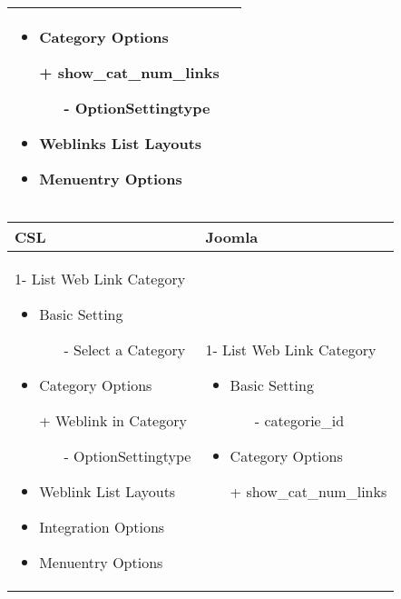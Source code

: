 \begin{minipage}{0.7\textwidth}
\begin{tabular}{|p{} | p{}|}
\begin{itemize}
\begin{enumerate}
	   \end{enumerate}
   	\item Category Options
   	\item[+] show\_cat\_num\_links
   		    	  \begin{enumerate}
   		    			 \item[-] OptionSettingtype
   		    	\end{enumerate}
   	\item Weblinks List Layouts
	\item Menuentry Options
 \end{itemize}
\\
\hline
\end{tabular}
\end{minipage}

\begin{minipage}{0.7\textwidth}
\begin{tabular}{|p{} | p{}|}
\hline
\textbf{CSL} & \textbf{Joomla} \\ 
\hline
 1- List Web Link Category
   \begin{itemize}
     \item Basic  Setting 
    		\begin{enumerate}
    			\item[-] Select a Category 
    		\end{enumerate}
    	\item Category Options
    	\item[+] Weblink in Category 
    		    	  \begin{enumerate}
    		    			 \item[-] OptionSettingtype
    		    	\end{enumerate}
    \item Weblink List Layouts
    	\item Integration Options
 	\item Menuentry Options
  \end{itemize}
 & 
1- List Web Link Category
  \begin{itemize}
    \item Basic  Setting 
   		\begin{enumerate}
   			\item[-] categorie\_id
   		\end{enumerate}
   	\item Category Options
   	\item[+] show\_cat\_num\_links
   		    	  \begin{enumerate}

\end{enumerate}
\end{itemize}
\end{tabular}
\end{minipage}
